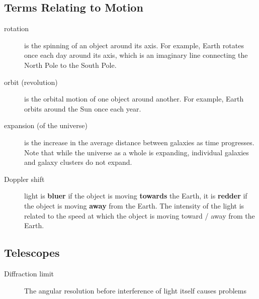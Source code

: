 \subsection{Terms Relating to Motion}
\begin{description}
\item[rotation] is the spinning of an object around its axis. For example, Earth rotates once each day around its axis, which is an imaginary
line connecting the North Pole to the South Pole.
\item[orbit (revolution)] is the orbital motion of one object around another. For example, Earth orbits around the Sun once each year.
\item[expansion (of the universe)] is the increase in the average distance between galaxies as time progresses. Note that while the universe as a whole is expanding, individual galaxies and galaxy clusters do not expand.
\item[Doppler shift] light is \textbf{bluer} if the object is moving \textbf{towards} the Earth, it is \textbf{redder} if the object is moving \textbf{away} from the Earth. The intensity of the light is related to the speed at which the object is moving toward / away from the Earth.
\end{description}

\subsection{Telescopes}
\begin{description}
\item[Diffraction limit] The angular resolution before interference of light itself causes problems
\end{description}
